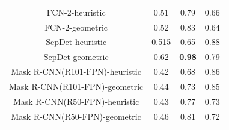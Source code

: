 \documentclass[letterpaper]{article} %
\begin{document}
\begin{table}[h]
\begin{tabular}{c|ccc}
FCN-2-heuristic    & 0.51   & 0.79  & 0.66 \\

FCN-2-geometric    & 0.52  & 0.83  & 0.64 \\

SepDet-heuristic  &   0.515  &  0.65 & 0.88 \\


SepDet-geometric  & 0.62  & \textbf{0.98} & 0.79 \\



Mask R-CNN(R101-FPN)-heuristic & 0.42 & 0.68 & 0.86 \\


Mask R-CNN(R101-FPN)-geometric & 0.44 & 0.73 & 0.85 \\


Mask R-CNN(R50-FPN)-heuristic & 0.43 & 0.77 & 0.73 \\

Mask R-CNN(R50-FPN)-geometric & 0.46 & 0.81 & 0.72 \\


\end{tabular}
\end{table}
\end{document}

